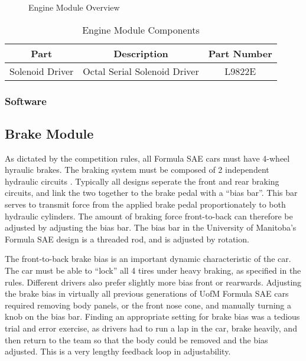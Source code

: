   \begin{figure}[H]
    \begin{centering}
      
    \end{centering}

    \caption{Engine Module Overview\label{fig:Engine-Module-Overview}}
  \end{figure}

  \begin{table}[H]
    \caption{Engine Module Components\label{tab:Engine-Module}}
    \begin{centering}
      \begin{tabular}{|c|c|c|}
	\hline 
	Part & Description & Part Number\tabularnewline
	\hline
	\hline
	Solenoid Driver & Octal Serial Solenoid Driver & L9822E\tabularnewline
	\hline
      \end{tabular}
    \end{centering}
  \end{table}


\subsubsection{Software}

%
%
\subsection{Brake Module}

As dictated by the competition rules, all Formula SAE cars must have 4-wheel hyraulic brakes. The braking system must be composed of 2 independent hydraulic circuits \cite{2010fsaerules}. Typically all designs seperate the front and rear braking circuits, and link the two together to the brake pedal with a {}``bias bar''. This bar serves to transmit force from the applied brake pedal proportionately to both hydraulic cylinders. The amount of braking force front-to-back can therefore be adjusted by adjusting the bias bar. The bias bar in the University of Manitoba's Formula SAE design is a threaded rod, and is adjusted by rotation.

The front-to-back brake bias is an important dynamic characteristic of the car. The car must be able to {}``lock'' all 4 tires under heavy braking, as specified in the rules. Different drivers also prefer slightly more bias front or rearwards. Adjusting the brake bias in virtually all previous generations of UofM Formula SAE cars required removing body panels, or the front nose cone, and manually turning a knob on the bias bar. Finding an appropriate setting for brake bias was a tedious trial and error exercise, as drivers had to run a lap in the car, brake heavily, and then return to the team so that the body could be removed and the bias adjusted. This is a very lengthy feedback loop in adjustability.

